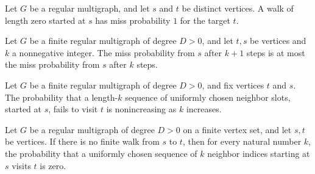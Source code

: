 \begin{theorem}
\label{Randomized.RegularMultigraph.missProb_zero_of_ne}
\leanok
{}
Let $G$ be a regular multigraph, and let $s$ and $t$ be distinct vertices. A walk of
length zero started at $s$ has miss probability $1$ for the target $t$.
\end{theorem}

\begin{theorem}
\label{Randomized.RegularMultigraph.missProb_succ_le}
\leanok
{}
Let $G$ be a finite regular multigraph of degree $D>0$, and let $t,s$ be vertices and
$k$ a nonnegative integer. The miss probability from $s$ after $k+1$ steps is at most
the miss probability from $s$ after $k$ steps.
\end{theorem}

\begin{theorem}
\label{Randomized.RegularMultigraph.missProb_antitone}
\leanok
{}
Let $G$ be a finite regular multigraph of degree $D>0$, and fix vertices $t$ and $s$.
The probability that a length-$k$ sequence of uniformly chosen neighbor slots, started
at $s$, fails to visit $t$ is nonincreasing as $k$ increases.
\end{theorem}

\begin{theorem}
\label{Randomized.RegularMultigraph.hitProb_eq_zero_of_not_reachable}
\leanok
{}
Let $G$ be a regular multigraph of degree $D>0$ on a finite vertex set, and let $s,t$ be
vertices. If there is no finite walk from $s$ to $t$, then for every natural number $k$,
the probability that a uniformly chosen sequence of $k$ neighbor indices starting at $s$
visits $t$ is zero.
\end{theorem}

